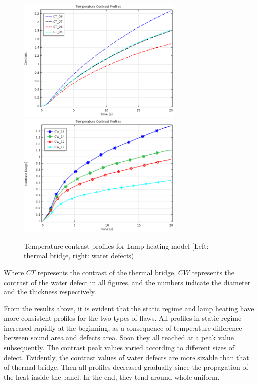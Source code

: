 \documentclass{tQRT2e}
\begin{document}
\begin{figure}
	\includegraphics[width=8cm, height=6cm]{Truck_panel_Model_Flash_CT}
	\includegraphics[width=8cm, height=6cm]{Truck_panel_Model_Flash_CW}
	\caption{Temperature contrast profiles for Lamp heating model (Left: thermal bridge, right: water defects)}
	\label{sim_fig_ht}
\end{figure}
Where $ CT $ represents the contrast of the thermal bridge, $ CW $ represents the contrast of the water defect in all figures, and the numbers indicate the diameter and the thickness respectively. 

From the results above, it is evident that the static regime and lamp heating have more consistent profiles for the two types of flaws. All profiles in static regime increased rapidly at the beginning, as a consequence of temperature difference between sound area and defects area. Soon they all reached at a peak value subsequently. The contrast peak values varied according to different sizes of defect. Evidently, the contrast values of water defects are more sizable than that of thermal bridge. Then all profiles decreased gradually since the propagation of the heat inside the panel. In the end, they tend around whole uniform. 
\end{document}
